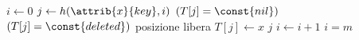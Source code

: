 \begin{codebox}
\li $i \gets 0$
\li \Repeat
\li     $j \gets h(\attrib{x}{key},i)$
\li     \If $(T[j] = \const{nil})$ \Or $(T[j] = \const{deleted})$ 
        	\Comment posizione libera
\li     \Then
            $T[j] \gets x$
\li         \Return $j$
        \End
\li     $i \gets i + 1$
\li \Until $i = m$
\li \Error
\end{codebox}